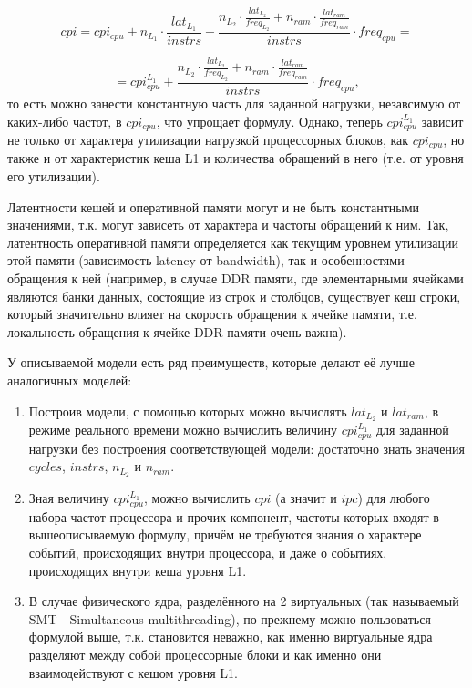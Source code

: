     \begin{equation}
        cpi = cpi_{cpu} + n_{L_1} \cdot \frac{lat_{L_1}}{instrs} +
        \frac{n_{L_2} \cdot \frac{lat_{L_2}}{freq_{L_2}} +
        n_{ram} \cdot \frac{lat_{ram}}{freq_{ram}}}{instrs} \cdot freq_{cpu} =
    \end{equation}

    \begin{equation}
        = cpi_{cpu}^{L_1} + \frac{n_{L_2} \cdot \frac{lat_{L_2}}{freq_{L_2}} +
        n_{ram} \cdot \frac{lat_{ram}}{freq_{ram}}}{instrs} \cdot freq_{cpu},
    \end{equation}
    то есть можно занести константную часть для заданной нагрузки, незавсимую от каких-либо
    частот, в $cpi_{cpu}$, что упрощает формулу. Однако, теперь $cpi_{cpu}^{L_1}$ зависит
    не только от характера утилизации нагрузкой процессорных блоков, как $cpi_{cpu}$, но
    также и от характеристик кеша L1 и количества обращений в него (т.е. от уровня его утилизации).

    Латентности кешей и оперативной памяти могут и не быть константными значениями, т.к.
    могут зависеть от характера и частоты обращений к ним. Так, латентность оперативной
    памяти определяется как текущим уровнем утилизации этой памяти (зависимость latency от
    bandwidth), так и особенностями обращения к ней (например, в случае DDR памяти,
    где элементарными ячейками являются банки данных, состоящие из строк и столбцов,
    существует кеш строки, который значительно влияет на скорость обращения
    к ячейке памяти, т.е. локальность обращения к ячейке DDR памяти очень важна).

    У описываемой модели есть ряд преимуществ, которые делают её лучше аналогичных моделей:
    \begin{enumerate}
        \item Построив модели, с помощью которых можно вычислять $lat_{L_2}$ и $lat_{ram}$,
        в режиме реального времени можно вычислить величину $cpi_{cpu}^{L_1}$ для
        заданной нагрузки без построения соответствующей модели: достаточно знать значения
        $cycles$, $instrs$, $n_{L_2}$ и $n_{ram}$.
        \item Зная величину $cpi_{cpu}^{L_1}$, можно вычислить $cpi$ (а значит и $ipc$)
        для любого набора частот процессора и прочих компонент, частоты которых входят в
        вышеописываемую формулу, причём не требуются знания о характере событий,
        происходящих внутри процессора, и даже о событиях, происходящих внутри кеша уровня L1.
        \item В случае физического ядра, разделённого на 2 виртуальных (так называемый
        SMT - Simultaneous multithreading), по-прежнему можно пользоваться формулой выше, т.к.
        становится неважно, как именно виртуальные ядра разделяют между собой процессорные блоки
        и как именно они взаимодействуют с кешом уровня L1.
    \end{enumerate}

